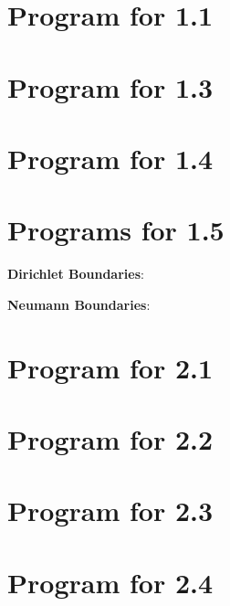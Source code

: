 \documentclass[10pt]{article}
\begin{document}
\newpage
\begin{appendix}
\section{Program for 1.1}
\label{a:1.1}

\section{Program for 1.3}
\label{a:1.3}

\section{Program for 1.4}
\label{a:1.4}

\section{Programs for 1.5}
\label{a:1.5}
{\bf Dirichlet Boundaries}:

{\bf Neumann Boundaries}:

\section{Program for 2.1}
\label{a:2.1}

\section{Program for 2.2}
\label{a:2.2}

\section{Program for 2.3}
\label{a:2.3}

\section{Program for 2.4}
\label{a:2.4}

\end{appendix}
\end{document}
